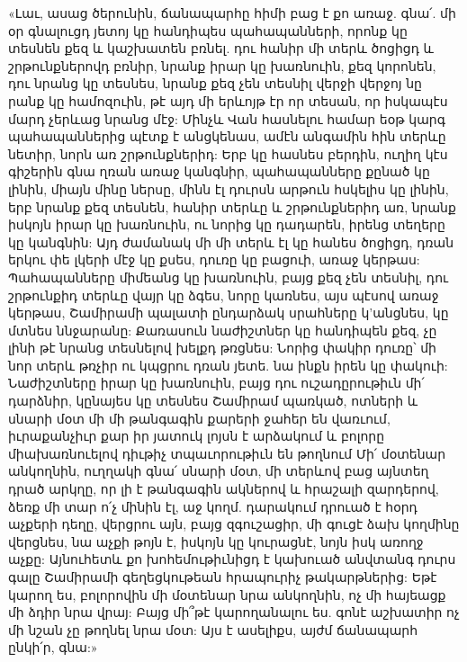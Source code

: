 \documentclass{article}
\begin{document}
{«Լաւ, ասաց ծերունին, ճանապարհը հիմի բաց է քո առաջ. գնա՛. մի օր գնալուցդ յետոյ կը հանդիպես պահապանների, որոնք կը տեսնեն քեզ և կաշխատեն բռնել. դու հանիր մի տերև ծոցիցդ և շրթունքներովդ բռնիր, նրանք իրար կը խառնուին, քեզ կորոնեն, դու նրանց կը տեսնես, նրանք քեզ չեն տեսնիլ վերջի վերջոյ նը րանք կը համոզուին, թէ այդ մի երևոյթ էր որ տեսան, որ իսկապէս մարդ չերևաց նրանց մէջ: Մինչև Վան հասնելու համար եօթ կարգ պահապաններից պէտք է անցկենաս, ամէն անգամին հին տերևը նետիր, նորն առ շրթունքներիդ: Երբ կը հասնես բերդին, ուղիղ կէս գիշերին գնա ղռան առաջ կանգնիր, պահապանները քընած կը լինին, միայն մինը ներսը, մինն էլ դուրսն արթուն հսկելիս կը լինին, երբ նրանք քեզ տեսնեն, հանիր տերևը և շրթունքներիդ առ, նրանք իսկոյն իրար կը խառնուին, ու նորից կը դադարեն, իրենց տեղերը կը կանգնին: Այդ ժամանակ մի մի տերև էլ կը հանես ծոցիցդ, դռան երկու փե լկերի մէջ կը քսես, դուռը կը բացուի, առաջ կերթաս: Պահապանները միմեանց կը խառնուին, բայց քեզ չեն տեսնիլ, դու շրթունքիդ տերևը վայր կը ձգես, նորը կառնես, այս պէսով առաջ կերթաս, Շամիրամի պալատի ընդարձակ սրահները կ'անցնես, կը մտնես ննջարանը: Քառասուն նաժիշտներ կը հանդիպեն քեզ, չը լինի թէ նրանց տեսնելով խելքդ թռցնես: Նորից փակիր դուռը՝ մի նոր տերև թռչիր ու կպցրու դռան յետե. նա ինքն իրեն կը փակուի: Նաժիշտները իրար կը խառնուին, բայց դու ուշադըրութիւն մի՛ դարձնիր, կընայես կը տեսնես Շամիրամ պառկած, ոտների և սնարի մօտ մի մի թանգագին քարերի ջահեր են վառւում, իւրաքանչիւր քար իր յատուկ լոյսն է արձակում և բոլորը միախառնուելով դիւթիչ տպաւորութիւն են թողնում Մի՛ մօտենար անկողնին, ուղղակի գնա՛ սնարի մօտ, մի տերևով բաց այնտեղ դրած արկղը, որ լի է թանգագին ակներով և հրաշալի զարդերով, ձեռք մի տար ո՛չ մինին էլ, աջ կողմ. դարակում դրուած է հօրդ աչքերի դեղը, վերցրու այն, բայց զգուշացիր, մի գուցէ ձախ կողմինը վերցնես, նա աչքի թոյն է, իսկոյն կը կուրացնէ, նոյն իսկ առողջ աչքը: Այնուհետև քո խոհեմութիւնիցդ է կախուած անվտանգ դուրս գալը Շամիրամի գեղեցկութեան հրապուրիչ թակարթներից: Եթէ կարող ես, բոլորովին մի մօտենար նրա անկողնին, ոչ մի հայեացք մի ձդիր նրա վրայ: Բայց մի՞թէ կարողանալու ես. գոնէ աշխատիր ոչ մի նշան չը թողնել նրա մօտ: Այս է ասելիքս, այժմ ճանապարհ ընկի՛ր, գնա:»}
\clearpage
\section{}
\end{document}
